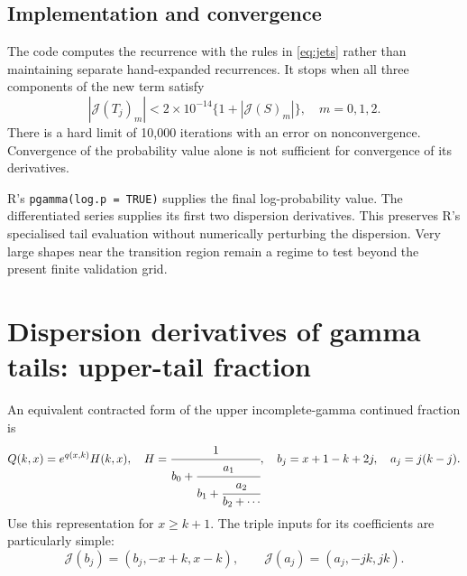 \documentclass[11pt,a4paper]{article}
\newcommand{\code}[1]{\texttt{#1}}
\newcommand{\J}{\mathcal{J}}
\begin{document}
\subsection{Implementation and convergence}
The code computes the recurrence with the rules in \eqref{eq:jets} rather
than maintaining separate hand-expanded recurrences. It stops when all three
components of the new term satisfy
\[
 |\J(T_j)_m|<2\times10^{-14}\{1+|\J(S)_m|\},\quad m=0,1,2.
\]
There is a hard limit of 10,000 iterations with an error on nonconvergence.
Convergence of the probability value alone is not sufficient for convergence
of its derivatives.

R's \code{pgamma(log.p = TRUE)} supplies the final log-probability value.
The differentiated series supplies its first two dispersion derivatives.
This preserves R's specialised tail evaluation without numerically
perturbing the dispersion. Very large shapes near the transition region
remain a regime to test beyond the present finite validation grid.

\newpage
\section{Dispersion derivatives of gamma tails: upper-tail fraction}
\label{sec:cf}
An equivalent contracted form of the upper incomplete-gamma continued
fraction \cite{dlmfcf} is
\begin{equation}
 Q(k,x)=e^{q(x,k)}H(k,x),\quad
 H=\cfrac{1}{b_0+\cfrac{a_1}{b_1+\cfrac{a_2}{b_2+\cdots}}},
 \quad b_j=x+1-k+2j,\quad a_j=j(k-j).
 \label{eq:cf}
\end{equation}
Use this representation for $x\geq k+1$. The triple inputs for its
coefficients are particularly simple:
\begin{equation}
 \J(b_j)=(b_j,-x+k,x-k),\qquad
 \J(a_j)=(a_j,-jk,jk).
 \label{eq:cfinputs}
\end{equation}
\end{document}
